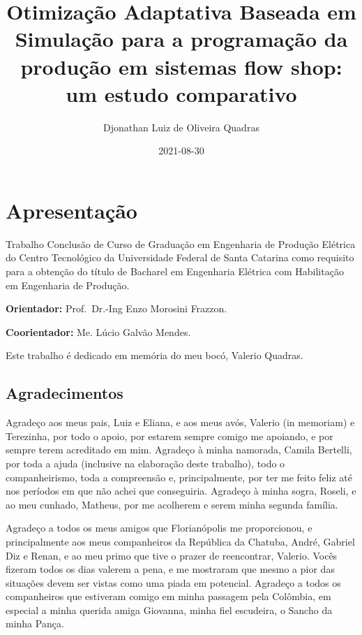 \documentclass[
]{book}
\title{Otimização Adaptativa Baseada em Simulação para a programação da produção em sistemas flow shop: um estudo comparativo}
\author{Djonathan Luiz de Oliveira Quadras}
\date{2021-08-30}
\begin{document}
\maketitle

{
\setcounter{tocdepth}{1}
\tableofcontents
}
\hypertarget{apresentauxe7uxe3o}{%
\chapter*{Apresentação}\label{apresentauxe7uxe3o}}

Trabalho Conclusão de Curso de Graduação em Engenharia de Produção Elétrica do Centro Tecnológico da Universidade Federal de Santa Catarina como requisito para a obtenção do título de Bacharel em Engenharia Elétrica com Habilitação em Engenharia de Produção.

\textbf{Orientador:} Prof.~Dr.-Ing Enzo Morosini Frazzon.

\textbf{Coorientador:} Me. Lúcio Galvão Mendes.

Este trabalho é dedicado em memória do meu bocó, Valerio Quadras.

\hypertarget{agradecimentos}{%
\section*{Agradecimentos}\label{agradecimentos}}

Agradeço aos meus pais, Luiz e Eliana, e aos meus avós, Valerio (in memoriam) e Terezinha, por todo o apoio, por estarem sempre comigo me apoiando, e por sempre terem acreditado em mim. Agradeço à minha namorada, Camila Bertelli, por toda a ajuda (inclusive na elaboração deste trabalho), todo o companheirismo, toda a compreensão e, principalmente, por ter me feito feliz até nos períodos em que não achei que conseguiria. Agradeço à minha sogra, Roseli, e ao meu cunhado, Matheus, por me acolherem e serem minha segunda família.

Agradeço a todos os meus amigos que Florianópolis me proporcionou, e principalmente aos meus companheiros da República da Chatuba, André, Gabriel Diz e Renan, e ao meu primo que tive o prazer de reencontrar, Valerio. Vocês fizeram todos os dias valerem a pena, e me mostraram que mesmo a pior das situações devem ser vistas como uma piada em potencial. Agradeço a todos os companheiros que estiveram comigo em minha passagem pela Colômbia, em especial a minha querida amiga Giovanna, minha fiel escudeira, o Sancho da minha Pança.
\end{document}
